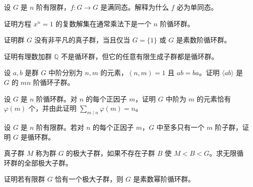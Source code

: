 \noindent\begin{minipage}{\textwidth}
设 $G$ 是 $n$ 阶有限群，$f:G\to G$ 是满同态。解释为什么 $f$ 必为单同态。
\end{minipage}\par\vfill
\noindent\begin{minipage}{\textwidth}
证明方程 $x^n=1$ 的复数解集在通常乘法下是一个 $n$ 阶循环群。
\end{minipage}\par\vfill
\newpage
\noindent\begin{minipage}{\textwidth}
证明群 $G$ 没有非平凡的真子群，当且仅当 $G=\{1\}$ 或 $G$ 是素数阶循环群。
\end{minipage}\par\vfill
\noindent\begin{minipage}{\textwidth}
证明有理数加群 $\mathbb Q$ 不是循环群，但它的任意有限生成子群都是循环群。
\end{minipage}\par\vfill
\noindent\begin{minipage}{\textwidth}
设 $a,b$ 是群 $G$ 中阶分别为 $n,m$ 的元素，$(n,m)=1$ 且 $ab=ba$。证明 $\langle ab\rangle$ 是 $G$ 的 $mn$ 阶循环子群。
\end{minipage}\par\vfill
\newpage
\noindent\begin{minipage}{\textwidth}
设 $G$ 是 $n$ 阶循环群。对 $n$ 的每个正因子 $m$，证明 $G$ 中阶为 $m$ 的元素恰有 $\varphi(m)$ 个，并由此证明 $\sum_{m\mid n}\varphi(m)=n$。
\end{minipage}\par\vfill
\noindent\begin{minipage}{\textwidth}
设 $G$ 是 $n$ 阶有限群。若对 $n$ 的每个正因子 $m$，$G$ 中至多只有一个 $m$ 阶子群，证明 $G$ 是循环群。
\end{minipage}\par\vfill
\noindent\begin{minipage}{\textwidth}
真子群 $M$ 称为群 $G$ 的极大子群，如果不存在子群 $B$ 使 $M<B<G$。求无限循环群的全部极大子群。
\end{minipage}\par\vfill
\newpage
\noindent\begin{minipage}{\textwidth}
证明若有限群 $G$ 恰有一个极大子群，则 $G$ 是素数幂阶循环群。
\end{minipage}\par\vfill
